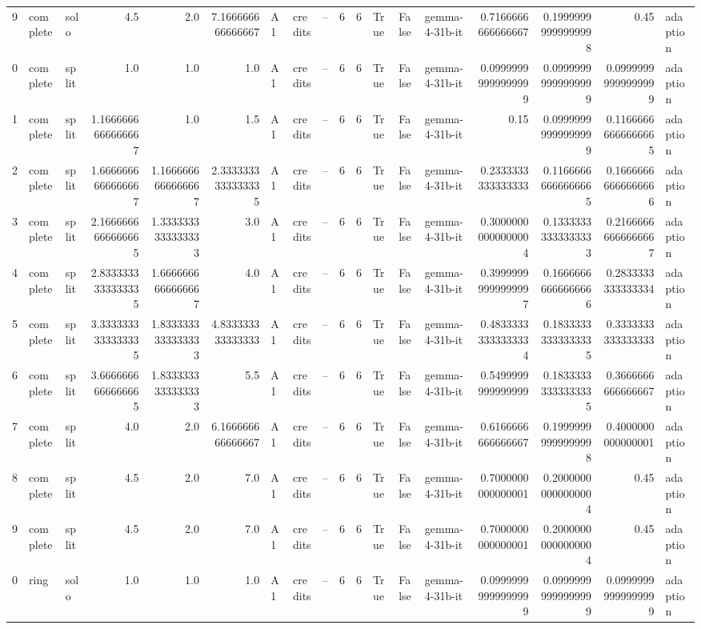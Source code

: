 \documentclass[11pt,a4paper]{article}
\begin{document}
\begin{table}[htbp]
\begin{tabular}{rllrrrlllrrlllrrrl}
9 & complete & solo & 4.5 & 2.0 & 7.166666666666667 & A1 & credits & -- & 6 & 6 & True & False & gemma-4-31b-it & 0.7166666666666667 & 0.19999999999999998 & 0.45 & adaption \\
0 & complete & split & 1.0 & 1.0 & 1.0 & A1 & credits & -- & 6 & 6 & True & False & gemma-4-31b-it & 0.09999999999999999 & 0.09999999999999999 & 0.09999999999999999 & adaption \\
1 & complete & split & 1.1666666666666667 & 1.0 & 1.5 & A1 & credits & -- & 6 & 6 & True & False & gemma-4-31b-it & 0.15 & 0.09999999999999999 & 0.11666666666666665 & adaption \\
2 & complete & split & 1.6666666666666667 & 1.1666666666666667 & 2.3333333333333335 & A1 & credits & -- & 6 & 6 & True & False & gemma-4-31b-it & 0.2333333333333333 & 0.11666666666666665 & 0.16666666666666666 & adaption \\
3 & complete & split & 2.1666666666666665 & 1.3333333333333333 & 3.0 & A1 & credits & -- & 6 & 6 & True & False & gemma-4-31b-it & 0.30000000000000004 & 0.13333333333333333 & 0.21666666666666667 & adaption \\
4 & complete & split & 2.8333333333333335 & 1.6666666666666667 & 4.0 & A1 & credits & -- & 6 & 6 & True & False & gemma-4-31b-it & 0.39999999999999997 & 0.16666666666666666 & 0.2833333333333334 & adaption \\
5 & complete & split & 3.3333333333333335 & 1.8333333333333333 & 4.833333333333333 & A1 & credits & -- & 6 & 6 & True & False & gemma-4-31b-it & 0.48333333333333334 & 0.18333333333333335 & 0.3333333333333333 & adaption \\
6 & complete & split & 3.6666666666666665 & 1.8333333333333333 & 5.5 & A1 & credits & -- & 6 & 6 & True & False & gemma-4-31b-it & 0.5499999999999999 & 0.18333333333333335 & 0.3666666666666667 & adaption \\
7 & complete & split & 4.0 & 2.0 & 6.166666666666667 & A1 & credits & -- & 6 & 6 & True & False & gemma-4-31b-it & 0.6166666666666667 & 0.19999999999999998 & 0.4000000000000001 & adaption \\
8 & complete & split & 4.5 & 2.0 & 7.0 & A1 & credits & -- & 6 & 6 & True & False & gemma-4-31b-it & 0.7000000000000001 & 0.20000000000000004 & 0.45 & adaption \\
9 & complete & split & 4.5 & 2.0 & 7.0 & A1 & credits & -- & 6 & 6 & True & False & gemma-4-31b-it & 0.7000000000000001 & 0.20000000000000004 & 0.45 & adaption \\
0 & ring & solo & 1.0 & 1.0 & 1.0 & A1 & credits & -- & 6 & 6 & True & False & gemma-4-31b-it & 0.09999999999999999 & 0.09999999999999999 & 0.09999999999999999 & adaption \\

\end{tabular}
\end{table}
\end{document}
